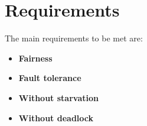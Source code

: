 \section{Requirements}

The main requirements to be met are:
\begin{itemize}
    \item \textbf{Fairness}
    \item \textbf{Fault tolerance}
    \item \textbf{Without starvation}
    \item \textbf{Without deadlock}
\end{itemize}